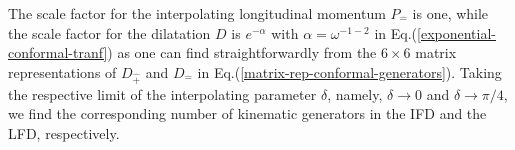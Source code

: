 \documentclass[journal,article,submit,pdftex,moreauthors]{Definitions/mdpi}
\begin{document}
The scale factor for the interpolating longitudinal momentum $P_{\hat{-}}$ is one, while the scale factor for the dilatation $D$ is $e^{-\alpha}$ with $\alpha=\omega^{-1-2}$ in Eq.(\ref{exponential-conformal-tranf}) as one can find straightforwardly from the $6\times6$ matrix representations of $D_{\hat{+}}$ and $D_{\hat{-}}$ in Eq.(\ref{matrix-rep-conformal-generators}). 
Taking the respective limit of the interpolating parameter $\delta$, namely,  
$\delta \to 0$ and $\delta \to \pi/4$, we find the corresponding number of kinematic generators in the IFD and the LFD, respectively. 
%
\begin{table}[h!]
\end{table}
\end{document}
